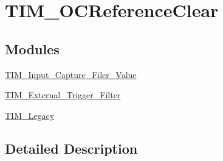\hypertarget{group___t_i_m___o_c_reference_clear}{\section{T\-I\-M\-\_\-\-O\-C\-Reference\-Clear}
\label{group___t_i_m___o_c_reference_clear}
}
\subsection*{Modules}
\begin{DoxyCompactItemize}
\item 
\hyperlink{group___t_i_m___input___capture___filer___value}{T\-I\-M\-\_\-\-Input\-\_\-\-Capture\-\_\-\-Filer\-\_\-\-Value}
\item 
\hyperlink{group___t_i_m___external___trigger___filter}{T\-I\-M\-\_\-\-External\-\_\-\-Trigger\-\_\-\-Filter}
\item 
\hyperlink{group___t_i_m___legacy}{T\-I\-M\-\_\-\-Legacy}
\end{DoxyCompactItemize}


\subsection{Detailed Description}
